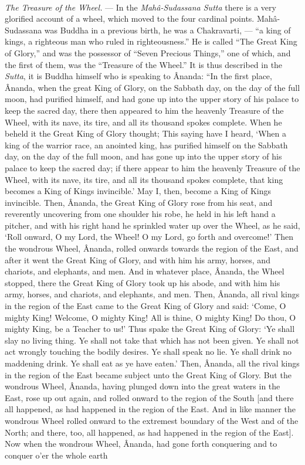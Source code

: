 \documentclass[a4paper, 11pt, oneside, polutonikogreek, english]{article}
\begin{document}
\paragraph{}
\emph{The Treasure of the Wheel.} --- In the \emph{Mahâ-Sudassana Sutta} there is a very glorified account of a wheel, which moved to the four cardinal points. Mahâ-Sudassana was Buddha in a previous birth, he was a Chakravarti, --- ``a king of kings, a righteous man who ruled in righteousness.'' He is called ``The Great King of Glory,'' and was the possessor of ``Seven Precious Things,'' one of which, and the first of them, was the ``Treasure of the Wheel.'' It is thus described in the \emph{Sutta}, it is Buddha himself who is speaking to Ânanda: ``In the first place, Ânanda, when the great King of Glory, on the Sabbath day, on the day of the full moon, had purified himself, and had gone up into the upper story of his palace to keep the sacred day, there then appeared to him the heavenly Treasure of the Wheel, with its nave, its tire, and all its thousand spokes complete. When he beheld it the Great King of Glory thought; This saying have I heard, `When a king of the warrior race, an anointed king, has purified himself on the Sabbath day, on the day of the full moon, and has gone up into the upper story of his palace to keep the sacred day; if there appear to him the heavenly Treasure of the Wheel, with its nave, its tire, and all its thousand spokes complete, that king becomes a King of Kings invincible.' May I, then, become a King of Kings invincible. Then, Ânanda, the Great King of Glory rose from his seat, and reverently uncovering from one shoulder his robe, he held in his left hand a pitcher, and with his right hand he sprinkled water up over the Wheel, as he said, `Roll onward, O my Lord, the Wheel! O my Lord, go forth and overcome!' Then the wondrous Wheel, Ânanda, rolled onwards towards the region of the East, and after it went the Great King of Glory, and with him his army, horses, and chariots, and elephants, and men. And in whatever place, Ânanda, the Wheel stopped, there the Great King of Glory took up his abode, and with him his army, horses, and chariots, and elephants, and men. Then, Ânanda, all rival kings in the region of the East came to the Great King of Glory and said: `Come, O mighty King! Welcome, O mighty King! All is thine, O mighty King! Do thou, O mighty King, be a Teacher to us!' Thus spake the Great King of Glory: `Ye shall slay no living thing. Ye shall not take that which has not been given. Ye shall not act wrongly touching the bodily desires. Ye shall speak no lie. Ye shall drink no maddening drink. Ye shall eat as ye have eaten.' Then, Ânanda, all the rival kings in the region of the East became subject unto the Great King of Glory. But the wondrous Wheel, Ânanda, having plunged down into the great waters in the East, rose up out again, and rolled onward to the region of the South [and there all happened, as had happened in the region of the East. And in like manner the wondrous Wheel rolled onward to the extremest boundary of the West and of the North; and there, too, all happened, as had happened in the region of the East]. Now when the wondrous Wheel, Ânanda, had gone forth conquering and to conquer o'er the whole earth 
\end{document}
